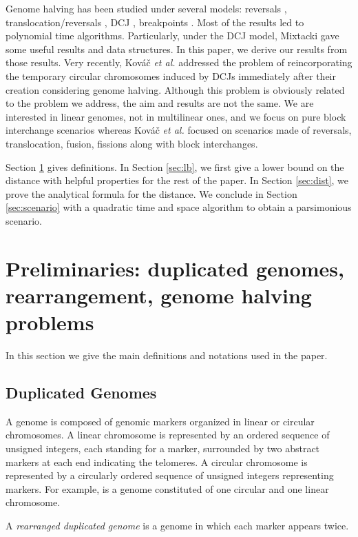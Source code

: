 \documentclass{llncs}
\def\etal{\textsl{et al.}\xspace}
\begin{document}
Genome halving has been studied under several models: reversals
\cite{Mabrouk98}, translocation/reversals \cite{Mabrouk03}, DCJ
\cite{Warren08}, breakpoints \cite{Tannier08}. Most of the results led
to polynomial time algorithms. Particularly, under the DCJ model,
Mixtacki \cite{Mixtacki08} gave some useful results and data structures. 
In this paper, we derive our results from those
results. Very recently, Kov{\'a}{\v c} \etal \cite{Kovac10} addressed 
the problem of
reincorporating the temporary circular chromosomes induced by DCJs
immediately after their creation considering genome halving. 
Although this problem is obviously related to the
problem we address, the aim and results are not the same. We are interested 
in linear genomes, not in multilinear ones,
and we focus on pure block interchange scenarios whereas Kov{\'a}{\v c}
\etal focused on scenarios made of reversals, translocation, fusion,
fissions along with block interchanges.

Section \ref{sec:pre} gives definitions. In Section \ref{sec:lb}, we
first give a lower bound on the distance with helpful properties for
the rest of the paper. In Section \ref{sec:dist}, we prove the
analytical formula for the distance. We conclude in Section
\ref{sec:scenario} with a quadratic time and space algorithm to
obtain a parsimonious scenario.


\section{Preliminaries: duplicated genomes, rearrangement, genome halving problems}
\label{sec:pre}

In this section we give the main definitions and notations used in the paper.

\subsection*{Duplicated Genomes}

A genome is composed of genomic markers organized in linear or circular 
chromosomes. A linear chromosome is represented by an ordered sequence of 
unsigned integers, each standing for a marker, surrounded by two abstract 
markers   at each end indicating the telomeres. A circular chromosome 
is represented by a circularly ordered sequence of unsigned integers 
representing markers. For example,  
 is a genome
constituted of one circular and one linear chromosome. 

\begin{definition}
A \emph{rearranged duplicated genome} is a genome in which each marker appears 
twice. 
\end{definition}
\end{document}
